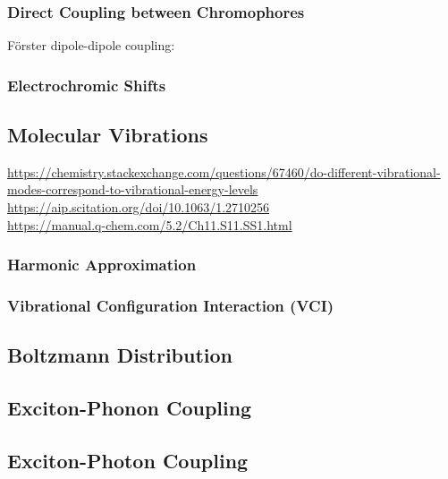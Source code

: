 \documentclass[9pt]{report}
\begin{document}
\subsubsection{Direct Coupling between Chromophores}
Förster dipole-dipole coupling:

\subsubsection{Electrochromic Shifts}




\subsection{Molecular Vibrations}
\url{https://chemistry.stackexchange.com/questions/67460/do-different-vibrational-modes-correspond-to-vibrational-energy-levels}\\
\url{https://aip.scitation.org/doi/10.1063/1.2710256}\\
\url{https://manual.q-chem.com/5.2/Ch11.S11.SS1.html}

\subsubsection{Harmonic Approximation}
\subsubsection{Vibrational Configuration Interaction (VCI)}


\subsection{Boltzmann Distribution}



\subsection{Exciton-Phonon Coupling}


\subsection{Exciton-Photon Coupling}
\end{document}
